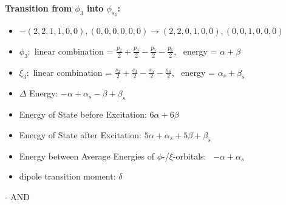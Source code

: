 \documentclass[12pt,a4paper]{article}
\begin{document}
        \noindent\textbf{Transition from $\phi_{3}$ into $\phi_{s_{3}}$:}
        \begin{itemize}
            \item $- (2, 2, 1, 1, 0, 0), (0, 0, 0, 0, 0, 0) \rightarrow (2, 2, 0, 1, 0, 0), (0, 0, 1, 0, 0, 0)$
        
            \item $\phi_{3}:$ linear combination = $\frac{p_{2}}{2} + \frac{p_{3}}{2} - \frac{p_{5}}{2} - \frac{p_{6}}{2}$, \
            energy = $\alpha + \beta$
            
            \item $\xi_{3}:$ linear combination = $\frac{s_{2}}{2} + \frac{s_{3}}{2} - \frac{s_{5}}{2} - \frac{s_{6}}{2}$, \
            energy = $\alpha_{s} + \beta_{s}$
            
            \item $\Delta$ Energy: $- \alpha + \alpha_{s} - \beta + \beta_{s}$
            \item Energy of State before Excitation: $6 \alpha + 6 \beta$
            \item Energy of State after Excitation: $5 \alpha + \alpha_{s} + 5 \beta + \beta_{s}$
            \item Energy between Average Energies of $\phi$-/$\xi$-orbitals: \
            $- \alpha + \alpha_{s}$
        
            \item dipole transition moment: $\delta$
        
        \end{itemize}
        
 -  AND 
\end{document}
